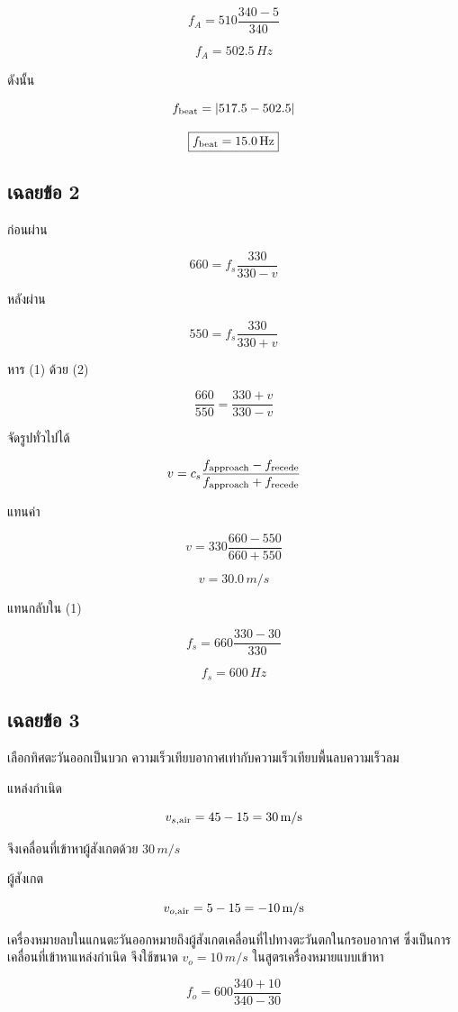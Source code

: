 \[
f_A=510\frac{340-5}{340}
\]

\[
\boxed{f_A=502.5\,\si{Hz}}
\]

ดังนั้น

\[
f_{\rm beat}=|517.5-502.5|
\]

\[
\boxed{f_{\rm beat}=15.0\,\si{Hz}}
\]

\subsection*{เฉลยข้อ 2}

ก่อนผ่าน

\[
660=f_s\frac{330}{330-v}
\tag{1}
\]

หลังผ่าน

\[
550=f_s\frac{330}{330+v}
\tag{2}
\]

หาร (1) ด้วย (2)

\[
\frac{660}{550}=\frac{330+v}{330-v}
\]

จัดรูปทั่วไปได้

\[
v=c_s\frac{f_{\rm approach}-f_{\rm recede}}
{f_{\rm approach}+f_{\rm recede}}
\]

แทนค่า

\[
v=330\frac{660-550}{660+550}
\]

\[
\boxed{v=30.0\,\si{m/s}}
\]

แทนกลับใน (1)

\[
f_s=660\frac{330-30}{330}
\]

\[
\boxed{f_s=600\,\si{Hz}}
\]

\subsection*{เฉลยข้อ 3}

เลือกทิศตะวันออกเป็นบวก ความเร็วเทียบอากาศเท่ากับความเร็วเทียบพื้นลบความเร็วลม

แหล่งกำเนิด

\[
v_{s,\rm air}=45-15=30\,\si{m/s}
\]

จึงเคลื่อนที่เข้าหาผู้สังเกตด้วย $30\,\si{m/s}$

ผู้สังเกต

\[
v_{o,\rm air}=5-15=-10\,\si{m/s}
\]

เครื่องหมายลบในแกนตะวันออกหมายถึงผู้สังเกตเคลื่อนที่ไปทางตะวันตกในกรอบอากาศ ซึ่งเป็นการเคลื่อนที่เข้าหาแหล่งกำเนิด จึงใช้ขนาด $v_o=10\,\si{m/s}$ ในสูตรเครื่องหมายแบบเข้าหา

\[
f_o=600\frac{340+10}{340-30}
\]

